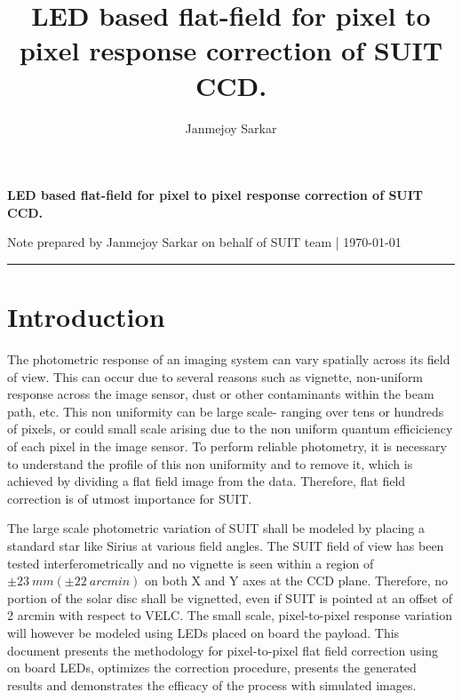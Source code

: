 \documentclass[11pt,a4paper]{article}
\author{Janmejoy Sarkar}
\title{LED based flat-field for pixel to pixel response correction of SUIT CCD.}
\begin{document}
\begin{center}
	\Large {\textbf{LED based flat-field for pixel to pixel response correction of SUIT CCD.}}
	
	\small Note prepared by Janmejoy Sarkar on behalf of SUIT team | \today
\end{center}
\hrule
\section{Introduction}
	The photometric response of an imaging system can vary spatially across its field of view. This can occur due to several reasons such as vignette, non-uniform response across the image sensor, dust or other contaminants within the beam path, etc. This non uniformity can be large scale- ranging over tens or hundreds of pixels, or could small scale arising due to the non uniform quantum efficiciency of each pixel in the image sensor. To perform reliable photometry, it is necessary to understand the profile of this non uniformity and to remove it,  which is achieved by dividing a flat field image from the data. Therefore, flat field correction is of utmost importance for SUIT.
	
	The large scale photometric variation of SUIT shall be modeled by placing a standard star like Sirius at various field angles. The SUIT field of view has been tested interferometrically and no vignette is seen within a  region of $\pm 23~mm (\pm 22 ~arcmin)$ on both X and Y axes at the CCD plane. Therefore, no portion of the solar disc shall be vignetted, even if SUIT is pointed at an offset of 2 arcmin with respect to VELC. The small scale, pixel-to-pixel response variation will however be modeled using LEDs placed on board the payload. This document presents the methodology for pixel-to-pixel flat field correction using on board LEDs, optimizes the correction procedure, presents the generated results and demonstrates the efficacy of the process with simulated images.
	
	
\end{document}
